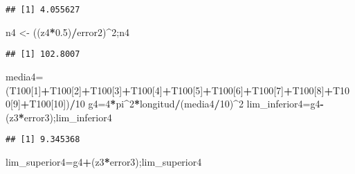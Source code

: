 \documentclass[
]{article}
\newenvironment{Shaded}{\begin{snugshade}}{\end{snugshade}}
\newcommand{\DecValTok}[1]{\textcolor[rgb]{0.00,0.00,0.81}{#1}}
\newcommand{\FloatTok}[1]{\textcolor[rgb]{0.00,0.00,0.81}{#1}}
\newcommand{\NormalTok}[1]{#1}
\newcommand{\OtherTok}[1]{\textcolor[rgb]{0.56,0.35,0.01}{#1}}
\newcommand{\SpecialCharTok}[1]{\textcolor[rgb]{0.81,0.36,0.00}{\textbf{#1}}}
\begin{document}
\begin{verbatim}
## [1] 4.055627
\end{verbatim}

\begin{Shaded}
\begin{Highlighting}[]
\NormalTok{n4 }\OtherTok{\textless{}{-}}\NormalTok{ ((z4}\SpecialCharTok{*}\FloatTok{0.5}\NormalTok{)}\SpecialCharTok{/}\NormalTok{error2)}\SpecialCharTok{\^{}}\DecValTok{2}\NormalTok{;n4}
\end{Highlighting}
\end{Shaded}

\begin{verbatim}
## [1] 102.8007
\end{verbatim}

\begin{Shaded}
\begin{Highlighting}[]
\NormalTok{media4}\OtherTok{=}\NormalTok{(T100[}\DecValTok{1}\NormalTok{]}\SpecialCharTok{+}\NormalTok{T100[}\DecValTok{2}\NormalTok{]}\SpecialCharTok{+}\NormalTok{T100[}\DecValTok{3}\NormalTok{]}\SpecialCharTok{+}\NormalTok{T100[}\DecValTok{4}\NormalTok{]}\SpecialCharTok{+}\NormalTok{T100[}\DecValTok{5}\NormalTok{]}\SpecialCharTok{+}\NormalTok{T100[}\DecValTok{6}\NormalTok{]}\SpecialCharTok{+}\NormalTok{T100[}\DecValTok{7}\NormalTok{]}\SpecialCharTok{+}\NormalTok{T100[}\DecValTok{8}\NormalTok{]}\SpecialCharTok{+}\NormalTok{T100[}\DecValTok{9}\NormalTok{]}\SpecialCharTok{+}\NormalTok{T100[}\DecValTok{10}\NormalTok{])}\SpecialCharTok{/}\DecValTok{10}
\NormalTok{g4}\OtherTok{=}\DecValTok{4}\SpecialCharTok{*}\NormalTok{pi}\SpecialCharTok{\^{}}\DecValTok{2}\SpecialCharTok{*}\NormalTok{longitud}\SpecialCharTok{/}\NormalTok{(media4}\SpecialCharTok{/}\DecValTok{10}\NormalTok{)}\SpecialCharTok{\^{}}\DecValTok{2}
\NormalTok{lim\_inferior4}\OtherTok{=}\NormalTok{g4}\SpecialCharTok{{-}}\NormalTok{(z3}\SpecialCharTok{*}\NormalTok{error3);lim\_inferior4}
\end{Highlighting}
\end{Shaded}

\begin{verbatim}
## [1] 9.345368
\end{verbatim}

\begin{Shaded}
\begin{Highlighting}[]
\NormalTok{lim\_superior4}\OtherTok{=}\NormalTok{g4}\SpecialCharTok{+}\NormalTok{(z3}\SpecialCharTok{*}\NormalTok{error3);lim\_superior4}
\end{Highlighting}
\end{Shaded}
\end{document}
